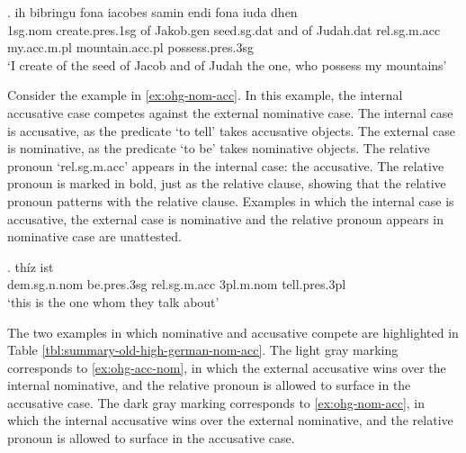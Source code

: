 \exg. ih bibringu fona iacobes samin endi fona iuda dhen   \\
1\ac{sg}.\ac{nom} {create}.\ac{pres}.1\ac{sg}\scsub{[acc]} of Jakob.\ac{gen} seed.\ac{sg}.\ac{dat} and of Judah.\ac{dat} \ac{rel}.\ac{sg}.\ac{m}.\ac{acc} my.\ac{acc}.\ac{m}.\ac{pl} mountain.\ac{acc}.\ac{pl} possess.\ac{pres}.3\ac{sg}\scsub{[nom]}\\
`I create of the seed of Jacob and of Judah the one, who possess my mountains' \label{ex:ohg-acc-nom}

Consider the example in \ref{ex:ohg-nom-acc}. In this example, the internal accusative case competes against the external nominative case.
The internal case is accusative, as the predicate  `to tell' takes accusative objects.
The external case is nominative, as the predicate  `to be' takes nominative objects.
The relative pronoun  `\ac{rel}.\ac{sg}.\ac{m}.\ac{acc}' appears in the internal case: the accusative. The relative pronoun is marked in bold, just as the relative clause, showing that the relative pronoun patterns with the relative clause.
Examples in which the internal case is accusative, the external case is nominative and the relative pronoun appears in nominative case are unattested.

\exg. thíz ist   \\
\ac{dem}.\ac{sg}.\ac{n}.\ac{nom} be.\ac{pres}.3\ac{sg}\scsub{[nom]} \ac{rel}.\ac{sg}.\ac{m}.\ac{acc} 3\ac{pl}.\ac{m}.\ac{nom} tell.\ac{pres}.3\ac{pl}\scsub{[acc]}\\
`this is the one whom they talk about' \label{ex:ohg-nom-acc}

The two examples in which nominative and accusative compete are highlighted in Table \ref{tbl:summary-old-high-german-nom-acc}. The light gray marking corresponds to \ref{ex:ohg-acc-nom}, in which the external accusative wins over the internal nominative, and the relative pronoun is allowed to surface in the accusative case. The dark gray marking corresponds to \ref{ex:ohg-nom-acc}, in which the internal accusative wins over the external nominative, and the relative pronoun is allowed to surface in the accusative case.

